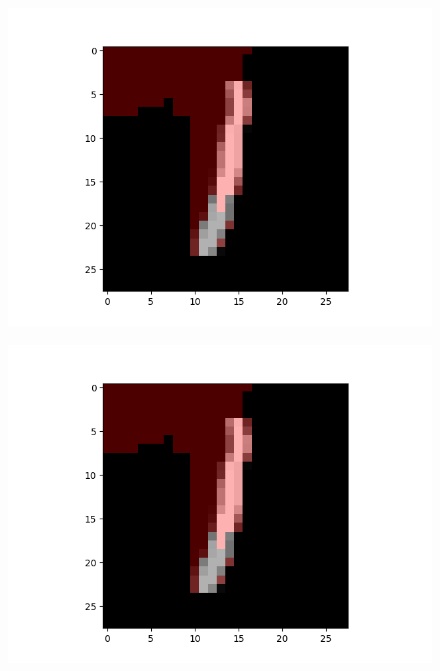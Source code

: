 \begin{figure}[H]
	\begin{minipage}[b]{0.33\textwidth}
		\captionsetup{labelformat=empty}
		\includegraphics[width=\textwidth]{LIME/LNN-(AND).png}
		\label{}
	\end{minipage}
	\begin{minipage}[b]{0.33\textwidth}
		\captionsetup{labelformat=empty}
		\includegraphics[width=\textwidth]{LIME/LNN-(OR-AND-AND).png}
		\label{}
	\end{minipage}
	\begin{minipage}[b]{0.33\textwidth}
		\captionsetup{labelformat=empty}

\end{minipage}
\end{figure}
